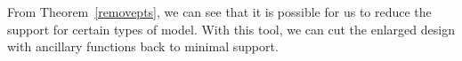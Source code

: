 \documentclass[11pt]{amsart}
\theoremstyle{definition}
\theoremstyle{remark}
\numberwithin{equation}{section}
\begin{document}
From Theorem~\ref{removepts}, we can see that it is possible for us to reduce the support for certain types of model. With this tool,  we can cut the enlarged design with ancillary functions back to minimal support. 

  

 

\end{document}
